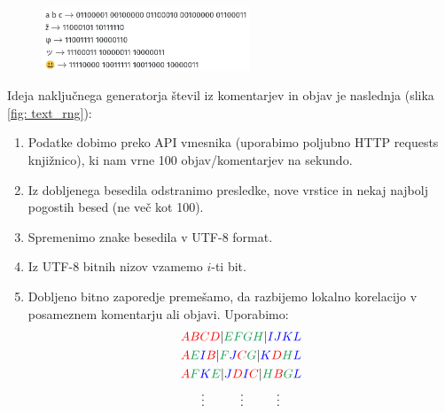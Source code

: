\documentclass[11pt, oneside]{article}
\theoremstyle{definition}
\begin{document}
\vspace*{-0.2cm}
\begin{figure}[h!]
    \centering
    \includegraphics[width=0.55\textwidth]{utf8_primeri.png}
\end{figure}
\noindent
Ideja naključnega generatorja števil iz komentarjev in objav je naslednja (slika \ref{fig: text_rng}):
\begin{enumerate}
    \item Podatke dobimo preko API vmesnika (uporabimo poljubno HTTP requests knjižnico), ki nam vrne 100 objav/komentarjev na sekundo.
    \item Iz dobljenega besedila odstranimo presledke, nove vrstice in nekaj najbolj pogostih besed (ne več kot 100).
    \item Spremenimo znake besedila v UTF-8 format.
    \item Iz UTF-8 bitnih nizov vzamemo $i$-ti bit.
    \item Dobljeno bitno zaporedje premešamo, da razbijemo lokalno korelacijo v posameznem komentarju ali objavi. Uporabimo:
          \begin{equation*}
              \begin{aligned}
                   & \color{red}{ABCD} \color{black}{|} \color{ForestGreen}{EFGH} \color{black}{|}  \color{blue}{IJKL} \\
                   & \color{red}{A} \color{ForestGreen}{E} \color{blue}{I} \color{red}{B} \color{black}{|}
                  \color{ForestGreen}{F} \color{blue}{J} \color{red}{C} \color{ForestGreen}{G} \color{black}{|}
                  \color{blue}{K} \color{red}{D} \color{ForestGreen}{H} \color{blue}{L}                                \\
                   & \color{red}{A} \color{ForestGreen}{F} \color{blue}{K} \color{ForestGreen}{E} \color{black}{|}
                  \color{blue}{J} \color{red}{D} \color{blue}{I} \color{red}{C} \color{black}{|}
                  \color{ForestGreen}{H} \color{red}{B} \color{ForestGreen}{G} \color{blue}{L}                         \\
                   & \quad\>\>\> \vdots \quad\quad\>\>\>\> \vdots \quad\quad\>\>\> \vdots
              \end{aligned}
          \end{equation*}

\end{enumerate}
\end{document}
